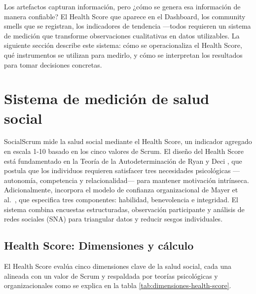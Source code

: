 Los artefactos capturan información, pero ¿cómo se genera esa información de manera confiable? El Health Score que aparece en el Dashboard, los community smells que se registran, los indicadores de tendencia ---todos requieren un sistema de medición que transforme observaciones cualitativas en datos utilizables. La siguiente sección describe este sistema: cómo se operacionaliza el Health Score, qué instrumentos se utilizan para medirlo, y cómo se interpretan los resultados para tomar decisiones concretas.

\section{Sistema de medición de salud social}

SocialScrum mide la salud social mediante el Health Score, un indicador agregado en escala 1-10 basado en los cinco valores de Scrum. El diseño del Health Score está fundamentado en la Teoría de la Autodeterminación de Ryan y Deci \cite{ryan2000self}, que postula que los individuos requieren satisfacer tres necesidades psicológicas ---autonomía, competencia y relacionalidad--- para mantener motivación intrínseca. Adicionalmente, incorpora el modelo de confianza organizacional de Mayer et al.\ \cite{mayer1995integrative}, que especifica tres componentes: habilidad, benevolencia e integridad. El sistema combina encuestas estructuradas, observación participante y análisis de redes sociales (SNA) para triangular datos y reducir sesgos individuales.

\subsection{Health Score: Dimensiones y cálculo}

El Health Score evalúa cinco dimensiones clave de la salud social, cada una alineada con un valor de Scrum y respaldada por teorías psicológicas y organizacionales como se explica en la tabla \ref{tab:dimensiones-health-score}.

